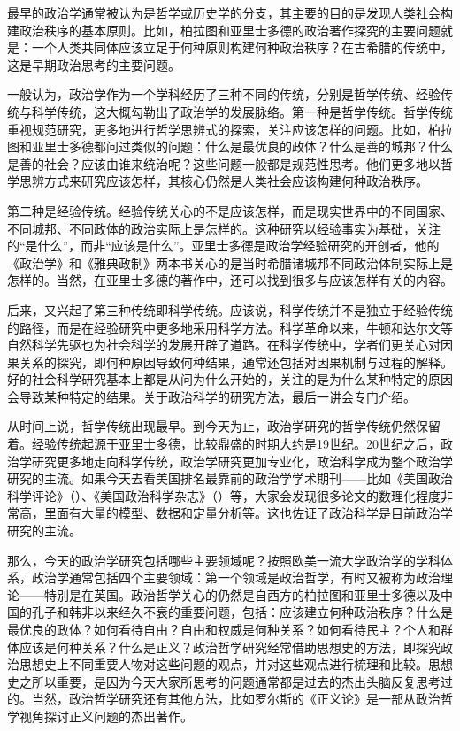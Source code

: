 最早的政治学通常被认为是哲学或历史学的分支，其主要的目的是发现人类社会构建政治秩序的基本原则。比如，柏拉图和亚里士多德的政治著作探究的主要问题就是：一个人类共同体应该立足于何种原则构建何种政治秩序？在古希腊的传统中，这是早期政治思考的主要问题。

一般认为，政治学作为一个学科经历了三种不同的传统，分别是哲学传统、经验传统与科学传统，这大概勾勒出了政治学的发展脉络。第一种是哲学传统。哲学传统重视规范研究，更多地进行哲学思辨式的探索，关注应该怎样的问题。比如，柏拉图和亚里士多德都问过类似的问题：什么是最优良的政体？什么是善的城邦？什么是善的社会？应该由谁来统治呢？这些问题一般都是规范性思考。他们更多地以哲学思辨方式来研究应该怎样，其核心仍然是人类社会应该构建何种政治秩序。

第二种是经验传统。经验传统关心的不是应该怎样，而是现实世界中的不同国家、不同城邦、不同政体的政治实际上是怎样的。这种研究以经验事实为基础，关注的“是什么”，而非“应该是什么”。亚里士多德是政治学经验研究的开创者，他的《政治学》和《雅典政制》两本书关心的是当时希腊诸城邦不同政治体制实际上是怎样的。当然，在亚里士多德的著作中，还可以找到很多与应该怎样有关的内容。

后来，又兴起了第三种传统即科学传统。应该说，科学传统并不是独立于经验传统的路径，而是在经验研究中更多地采用科学方法。科学革命以来，牛顿和达尔文等自然科学先驱也为社会科学的发展开辟了道路。在科学传统中，学者们更关心对因果关系的探究，即何种原因导致何种结果，通常还包括对因果机制与过程的解释。好的社会科学研究基本上都是从问为什么开始的，关注的是为什么某种特定的原因会导致某种特定的结果。关于政治科学的研究方法，最后一讲会专门介绍。

从时间上说，哲学传统出现最早。到今天为止，政治学研究的哲学传统仍然保留着。经验传统起源于亚里士多德，比较鼎盛的时期大约是19世纪。20世纪之后，政治学研究更多地走向科学传统，政治学研究更加专业化，政治科学成为整个政治学研究的主流。如果今天去看美国排名最靠前的政治学学术期刊——比如《美国政治科学评论》（）、《美国政治科学杂志》（）等，大家会发现很多论文的数理化程度非常高，里面有大量的模型、数据和定量分析等。这也佐证了政治科学是目前政治学研究的主流。

那么，今天的政治学研究包括哪些主要领域呢？按照欧美一流大学政治学的学科体系，政治学通常包括四个主要领域：第一个领域是政治哲学，有时又被称为政治理论——特别是在英国。政治哲学关心的仍然是自西方的柏拉图和亚里士多德以及中国的孔子和韩非以来经久不衰的重要问题，包括：应该建立何种政治秩序？什么是最优良的政体？如何看待自由？自由和权威是何种关系？如何看待民主？个人和群体应该是何种关系？什么是正义？政治哲学研究经常借助思想史的方法，即探究政治思想史上不同重要人物对这些问题的观点，并对这些观点进行梳理和比较。思想史之所以重要，是因为今天大家所思考的问题通常都是过去的杰出头脑反复思考过的。当然，政治哲学研究还有其他方法，比如罗尔斯的《正义论》是一部从政治哲学视角探讨正义问题的杰出著作。

